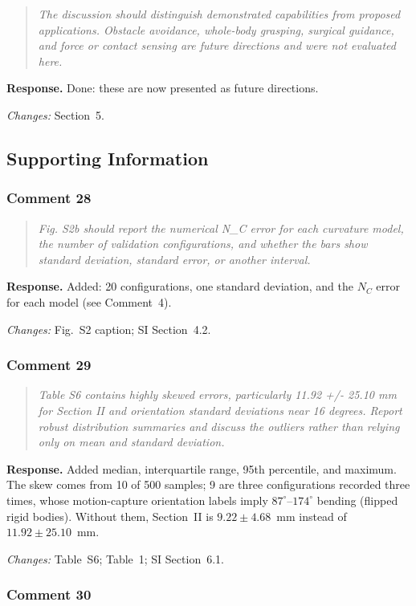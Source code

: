 \documentclass[11pt,a4paper]{article}
\newcommand{\rc}[1]{\begin{quote}\color{black!70}\itshape #1\end{quote}}
\begin{document}
\rc{The discussion should distinguish demonstrated capabilities from proposed applications. Obstacle avoidance, whole-body grasping, surgical guidance, and force or contact sensing are future directions and were not evaluated here.}
\textbf{Response.} Done: these are now presented as future directions.

\textit{Changes:} Section~5.

\subsection*{Supporting Information}

\subsubsection*{Comment 28}

\rc{Fig. S2b should report the numerical N\_C error for each curvature model, the number of validation configurations, and whether the bars show standard deviation, standard error, or another interval.}
\textbf{Response.} Added: 20 configurations, one standard deviation, and the $N_C$ error for each model (see Comment~4).

\textit{Changes:} Fig.~S2 caption; SI Section~4.2.

\subsubsection*{Comment 29}

\rc{Table S6 contains highly skewed errors, particularly 11.92 +/- 25.10 mm for Section II and orientation standard deviations near 16 degrees. Report robust distribution summaries and discuss the outliers rather than relying only on mean and standard deviation.}
\textbf{Response.} Added median, interquartile range, 95th percentile, and maximum. The skew comes from 10 of 500 samples; 9 are three configurations recorded three times, whose motion-capture orientation labels imply $87^\circ$--$174^\circ$ bending (flipped rigid bodies). Without them, Section~II is $9.22 \pm 4.68$~mm instead of $11.92 \pm 25.10$~mm.

\textit{Changes:} Table~S6; Table~1; SI Section~6.1.

\subsubsection*{Comment 30}
\end{document}
